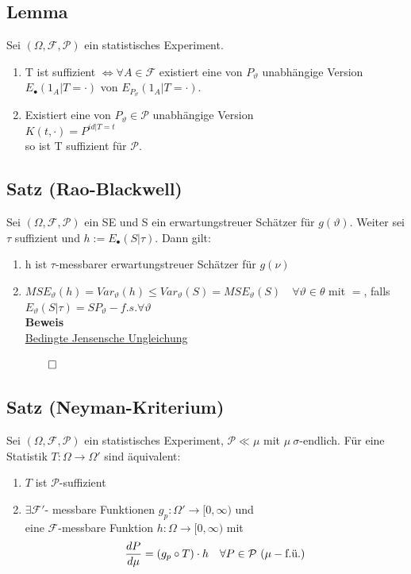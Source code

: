 \documentclass[german,10pt,oneside, fleqn, a4paper]{article}
\newcommand{\LRa}{\Leftrightarrow}
\newcommand{\ra}{\rightarrow}
\newcommand{\QED}{\begin{flushright}$\qed$\end{flushright}}
\newcommand{\mc}[1]{\mathcal{#1}}
\newcommand{\beweis}{\textbf{Beweis}\\}
\newcommand{\1}[1]{1_{#1}}
\newcommand{\2}[1]{\1{\brac{#1}}}
\newcommand{\f}{\mc{F}}
\newcommand{\p}{\mc{P}}
\newcommand{\qf}{\quad\forall}
\begin{document}
\subsection{Lemma}
\label{10.5} Sei $(\Omega,\f,\p)$ ein statistisches Experiment.\begin{enumerate}[label=(\alph*)]
\item T ist suffizient $\LRa \forall A\in\f$ existiert eine von $P_\vartheta$ unabhängige Version $E_\bullet(1_A|T=\cdot)$ von $E_{P_\vartheta}(1_A|T=\cdot).$
\item Existiert eine von $P_\vartheta\in\p$ unabhängige Version \\
$K(t,\cdot)=P^{id|T=t}$\\
so ist T suffizient für $\p$.
\end{enumerate}

\subsection{Satz (Rao-Blackwell)}
\label{10.6}
Sei $(\Omega,\f,\p)$ ein SE und S ein erwartungstreuer Schätzer für $g(\vartheta)$. Weiter sei $\tau$ suffizient und $h:=E_\bullet(S|\tau)$. Dann gilt:\begin{enumerate}[label=(\roman*)]
\item h ist $\tau$-messbarer erwartungstreuer Schätzer für $g(\nu)$
\item $MSE_\vartheta(h)=Var_\vartheta(h)\leq Var_\vartheta(S)=MSE_\vartheta(S)\qf\vartheta\in\theta$ mit \grqq$=$\grqq, falls \\
$E_\vartheta(S|\tau)=S P_\vartheta-f.s.\forall\vartheta$\\
\beweis
\hyperref[6.2]{Bedingte Jensensche Ungleichung}\QED
\end{enumerate}

\subsection{Satz (Neyman-Kriterium)}
\label{10.7}
Sei $(\Omega,\f,\p)$ ein statistisches Experiment, $\p\ll\mu$ mit $\mu\ \sigma$-endlich. Für eine Statistik $T:\Omega\ra\Omega'$ sind äquivalent:\begin{enumerate}[label=(\alph*)]
\item $T$ ist $\p$-suffizient
\item $\exists \f'$- messbare Funktionen $g_p:\Omega'\ra [0,\infty)$ und\\ eine $\f$-messbare Funktion $h:\Omega\ra [0,\infty)$ mit \[\dfrac{dP}{d\mu}=(g_p\circ T)\cdot h\quad\forall P\in\p$ $(\mu-\text{f.ü.})\] 
\end{enumerate}
\end{document}
